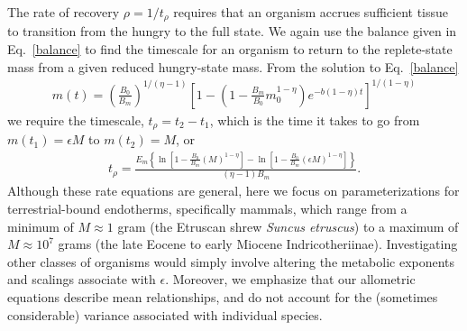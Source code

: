 \documentclass{pnastwo}
\begin{document}
\begin{article}
The rate of recovery $\rho = 1/t_\rho$ requires that an organism accrues
sufficient tissue to transition from the hungry to the full state.  We again
use the balance given in Eq.~\ref{balance} to find the timescale for an
organism to return to the replete-state mass from a given reduced
hungry-state mass.  From the solution to Eq.~\ref{balance}
\begin{eqnarray}
m\left(t\right)\!=\!\left(\!\frac{B_{0}}{B_{m}}\!\right)^{1/(\eta-1)}\!\!
\left[1\!-\!\left(1\!-\!\frac{B_{m}}{B_{0}}m_{0}^{1\!-\!\eta}\right)e^{-b\left(1\!-\!\eta\right)t}\right]^{1/\left(1-\eta\right)}%
\end{eqnarray}
we require the timescale, $t_{\rho}=t_{2}-t_{1}$, which is the time it takes
to go from $m\left(t_{1}\right)=\epsilon M$ to $m\left(t_{2}\right)=M$, or
\begin{eqnarray}
t_{\rho}=\frac{E_{m}\left\{\ln \left[1\!-\!\frac{B_{0}}{B_{m}}\left(M
  \right)^{1\!-\!\eta }\right]
-\ln \left[1\!-\!\frac{B_{0}}{B_{m}}\left(\epsilon M \right)^{1\!-\!\eta }\right]\right\}}{(\eta -1) B_{m}}.
\end{eqnarray}
Although these rate equations are general, here we focus on parameterizations
for terrestrial-bound endotherms, specifically mammals, which range from a
minimum of $M\approx1$ gram (the Etruscan shrew \emph{Suncus etruscus}) to a
maximum of $M\approx10^7$ grams (the late Eocene to early Miocene
Indricotheriinae).  Investigating other classes of organisms would simply
involve altering the metabolic exponents and scalings associate with
$\epsilon$. Moreover, we emphasize that our allometric equations describe
mean relationships, and do not account for the (sometimes considerable)
variance associated with individual species.
\\


\end{article}
\end{document}
